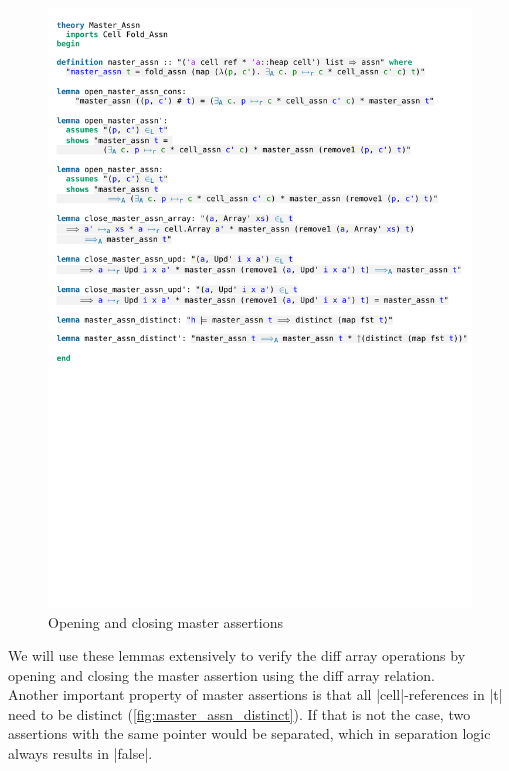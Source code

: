 \begin{figure}[htpb]
    \includegraphics[trim={0 15cm 0 5,4cm}, clip, width=1.00\textwidth]{figures/Theory_Master_Assn.pdf}
    \caption[Master assertion lemmas]{Opening and closing master assertions}
    \label{fig:master_assn_lemmas}
\end{figure}

\noindent We will use these lemmas extensively to verify the diff array operations by opening and closing the master assertion using the diff array relation. \\
Another important property of master assertions is that all |cell|-references in |t| need to be distinct (\autoref{fig:master_assn_distinct}). If that is not the case, two assertions with the same pointer would be separated, which in separation logic always results in |false|.

